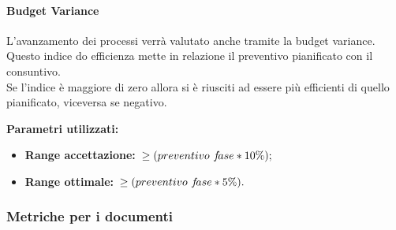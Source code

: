			\paragraph{Budget Variance}
				\label{sec:3.7.1.3}
				L'avanzamento dei processi verrà valutato anche tramite la budget variance. Questo indice do efficienza mette in relazione il preventivo pianificato con il consuntivo. \\
				Se l'indice è maggiore di zero allora si è riusciti ad essere più efficienti di quello pianificato, viceversa se negativo.
				
				\textbf{Parametri utilizzati:}
				\begin{itemize}
					\item \textbf{Range accettazione:}\ $\ge\-(preventivo\,\, f\!ase*10\%);$
					\item \textbf{Range ottimale:}\ $\ge\-(preventivo\,\, f\!ase*5\%).$
				\end{itemize}
		\subsubsection{Metriche per i documenti}
			\label{sec:3.7.2}
